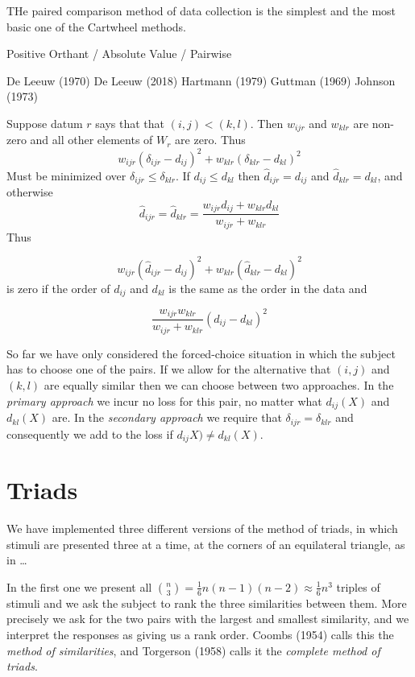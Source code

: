 \documentclass[
  12pt,
]{article}
\begin{document}
THe paired comparison method of data collection is the simplest and
the most basic one of the Cartwheel methods.

Positive Orthant / Absolute Value / Pairwise

De Leeuw (1970)
De Leeuw (2018)
Hartmann (1979)
Guttman (1969)
Johnson (1973)

Suppose datum \(r\) says that that \((i,j)<(k,l)\). Then \(w_{ijr}\) and \(w_{klr}\)
are non-zero and all other elements of \(W_r\) are zero.
Thus
\[
w_{ijr}(\delta_{ijr}-d_{ij})^2+w_{klr}(\delta_{klr}-d_{kl})^2
\]
Must be minimized over \(\delta_{ijr}\leq\delta_{klr}\). If \(d_{ij}\leq d_{kl}\)
then \(\hat d_{ijr}=d_{ij}\) and \(\hat d_{klr}=d_{kl}\), and otherwise
\[
\hat d_{ijr}=\hat d_{klr}=\frac{w_{ijr}d_{ij}+w_{klr}d_{kl}}{w_{ijr}+w_{klr}}
\]
Thus

\[w_{ijr}(\hat d_{ijr}-d_{ij})^2+w_{klr}(\hat d_{klr}-d_{kl})^2\]
is zero if the order of \(d_{ij}\) and \(d_{kl}\) is the same as the order in the data
and

\[
\frac{w_{ijr}w_{klr}}{w_{ijr}+w_{klr}}(d_{ij}-d_{kl})^2
\]

So far we have only considered the forced-choice situation in which
the subject has to choose one of the pairs. If we allow for the alternative
that \((i,j)\) and \((k,l)\) are equally similar then we can choose between two approaches. In the \emph{primary approach} we incur no loss for this pair, no matter what \(d_{ij}(X)\) and \(d_{kl}(X)\) are. In the \emph{secondary approach} we require that \(\delta_{ijr}=\delta_{klr}\) and consequently we add to the loss if
\(d_{ij}X)\not= d_{kl}(X)\).

\section{Triads}\label{triads}

We have implemented three different versions of the method of triads, in which stimuli are presented three at a time,
at the corners of an equilateral triangle, as in
\ldots{}

In the first one we present all
\(\binom{n}{3}=\frac16 n(n-1)(n-2)\approx\frac16n^3\)
triples of stimuli and we ask the subject to rank the
three similarities between them. More precisely we ask for the two pairs with the largest and smallest similarity,
and we interpret the responses as giving us a rank order.
Coombs (1954) calls this the \emph{method of similarities},
and Torgerson (1958) calls it the \emph{complete method of triads}.
\end{document}
